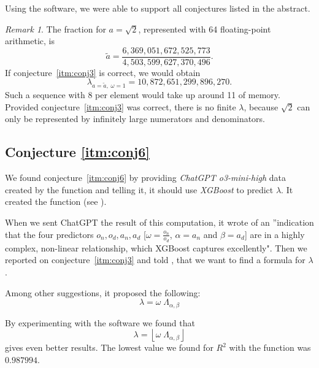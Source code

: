 \documentclass[11pt]{article}
\theoremstyle{remark}
\newtheorem{remark}{Remark}
\begin{document}
Using the \langc software, we were able to support all conjectures listed in the abstract.

\begin{remark}
The fraction for $a = \sqrt{2}$, represented with \SI{64}{\bit} floating-point arithmetic, is
%
\begin{equation}
\tilde{a} = \frac{6{,}369{,}051{,}672{,}525{,}773}{4{,}503{,}599{,}627{,}370{,}496}.
\end{equation}
%
If conjecture~\ref{itm:conj3} is correct, we would obtain
%
\begin{equation}
\lambda_{a = \tilde{a}, \; \omega = 1} = 10{,}872{,}651{,}299{,}896{,}270.
\end{equation}
%
Such a sequence with \SI{8}{\bit} per element would take up around \SI{11}{\petabyte} of memory.
Provided conjecture~\ref{itm:conj3} was correct, there is no finite $\lambda$, because $\sqrt{2}$ can only be represented by infinitely large numerators and denominators.
\end{remark}

\subsection{Conjecture \ref{itm:conj6}}

We found conjecture~\ref{itm:conj6} by providing \emph{ChatGPT o3-mini-high} data created by the \langc function  and telling it, it should use \emph{XGBoost} to predict $\lambda$. It created the \langp function  (see \cite{Kunert2025}). 

When we sent ChatGPT the result of this computation, it wrote of an ”indication that the four predictors \(o_n, o_d, a_n, a_d\) [$\omega = \frac{o_n}{o_d}$, $\alpha = a_n$ and $\beta = a_d$] are in a highly complex, non-linear relationship, which XGBoost captures excellently". Then we reported on conjecture~\ref{itm:conj3} and told \chat, that we want to find a formula for $\lambda$.

Among other suggestions, it proposed the following:
%
\begin{equation}
\lambda = \omega \; \Lambda_{\alpha, \beta}
\end{equation}

By experimenting with the \langc software we found that
%
\begin{equation}
\lambda = \left\lfloor \omega \; \Lambda_{\alpha, \beta} \right\rfloor
\end{equation}
%
gives even better results. The lowest value we found for $R^2$ with the \langc function  was $0.987994$.
\end{document}

